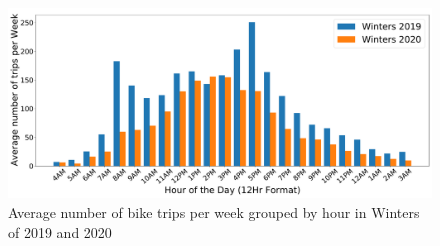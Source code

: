 \documentclass[11pt,a4paper]{article}
\begin{document}
\begin{figure}[h]
    \centering
    \includegraphics[width=\linewidth]{datasets/winters_weekly_bike_usage_by_hour.pdf}
    \caption{Average number of bike trips per week grouped by hour in Winters of 2019 and 2020}
    \label{average_trips_per_week_winters}
\end{figure}
\end{document}
